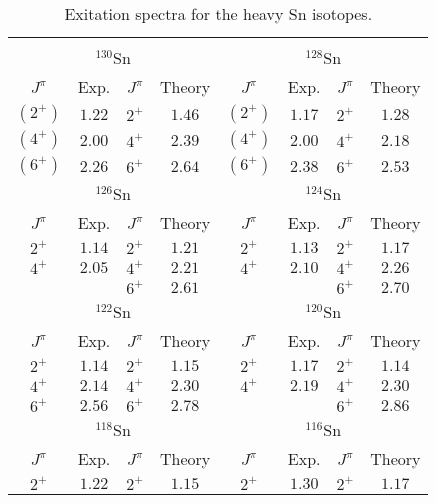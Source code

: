 \documentclass[twoside,12pt]{article}
\begin{document}
\begin{table}[t]
\caption{Exitation spectra for the heavy Sn isotopes. \label{tab:sn132spectra}}
\vspace{0.2cm}
\begin{center}
\footnotesize
\begin{tabular}{|cccccccc|}
\hline
&&&&&&&\\[-5pt]
\multicolumn{4}{|c}{$^{130}$Sn}&\multicolumn{4}{c|}{$^{128}$Sn}\\
$J^{\pi}$&Exp.&$J^{\pi}$&Theory&$J^{\pi}$&Exp.&$J^{\pi}$&Theory\\
\hline
$(2^{+})$ & $1.22$ & $2^{+}$   & $1.46$ &$(2^{+})$ & $1.17$ & $2^{+}$ & $1.28$\\
$(4^{+})$ & $2.00$ & $4^{+}$   & $2.39$ &$(4^{+})$ & $2.00$ & $4^{+}$ & $2.18$\\
$(6^{+})$ & $2.26$ & $6^{+}$   & $2.64$ &$(6^{+})$ & $2.38$ & $6^{+}$ & $2.53$\\\hline
\multicolumn{4}{|c}{$^{126}$Sn}&\multicolumn{4}{c|}{$^{124}$Sn}\\
$J^{\pi}$&Exp.&$J^{\pi}$&Theory&$J^{\pi}$&Exp.&$J^{\pi}$&Theory\\\hline
$2^{+}$ & $1.14$ & $2^{+}$   & $1.21$ &$2^{+}$ & $1.13$ & $2^{+}$ & $1.17$\\
$4^{+}$ & $2.05$ & $4^{+}$   & $2.21$ &$4^{+}$ & $2.10$ & $4^{+}$ & $2.26$\\
$     $ &        & $6^{+}$   & $2.61$ &        &        & $6^{+}$ & $2.70$\\\hline
\multicolumn{4}{|c}{$^{122}$Sn}&\multicolumn{4}{c|}{$^{120}$Sn}\\
$J^{\pi}$&Exp.&$J^{\pi}$&Theory&$J^{\pi}$&Exp.&$J^{\pi}$&Theory\\
\hline
$2^{+}$   & $1.14$ & $2^{+}$   & $1.15$ & $2^{+}$  & $1.17$ & $2^{+}$ & $1.14$\\
$4^{+}$   & $2.14$ & $4^{+}$   & $2.30$ & $4^{+}$  & $2.19$ & $4^{+}$ & $2.30$\\
$6^{+}$   & $2.56$ & $6^{+}$   & $2.78$ &          &        & $6^{+}$ & $2.86$\\\hline
\multicolumn{4}{|c}{$^{118}$Sn}&\multicolumn{4}{c|}{$^{116}$Sn}\\
$J^{\pi}$&Exp.&$J^{\pi}$&Theory&$J^{\pi}$&Exp.&$J^{\pi}$&Theory\\
\hline
$2^{+}$   & $1.22$ & $2^{+}$   & $1.15$ & $2^{+}$  & $1.30$ & $2^{+}$ & $1.17$\\[3pt]\hline
\end{tabular}
\end{center}
\end{table}
\end{document}
